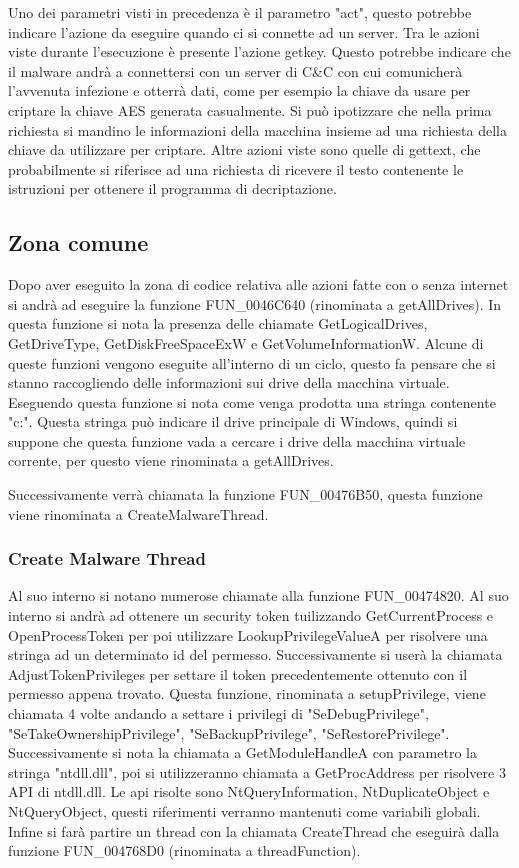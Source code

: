 \documentclass[a4paper,12pt]{article}
\begin{document}
Uno dei parametri visti in precedenza è il parametro "act", questo potrebbe indicare l'azione da eseguire quando ci si connette ad un server. Tra le azioni viste durante l'esecuzione è presente l'azione getkey. Questo potrebbe indicare che il malware andrà a connettersi con un server di C\&C con cui comunicherà l'avvenuta infezione e otterrà dati, come per esempio la chiave da usare per criptare la chiave AES generata casualmente. Si può ipotizzare che nella prima richiesta si mandino le informazioni della macchina insieme ad una richiesta della chiave da utilizzare per criptare.
Altre azioni viste sono quelle di gettext, che probabilmente si riferisce ad una richiesta di ricevere il testo contenente le istruzioni per ottenere il programma di decriptazione. 

\subsection{Zona comune}
Dopo aver eseguito la zona di codice relativa alle azioni fatte con o senza internet si andrà ad eseguire la funzione FUN\_0046C640 (rinominata a getAllDrives). In questa funzione si nota la presenza delle chiamate GetLogicalDrives, GetDriveType, GetDiskFreeSpaceExW e GetVolumeInformationW. Alcune di queste funzioni vengono eseguite all'interno di un ciclo, questo fa pensare che si stanno raccogliendo delle informazioni sui drive della macchina virtuale. Eseguendo questa funzione si nota come venga prodotta una stringa contenente "c:". Questa stringa può indicare il drive principale di Windows, quindi si suppone che questa funzione vada a cercare i drive della macchina virtuale corrente, per questo viene rinominata a getAllDrives.

Successivamente verrà chiamata la funzione FUN\_00476B50, questa funzione viene rinominata a CreateMalwareThread. 

\subsubsection{Create Malware Thread}
Al suo interno si notano numerose chiamate alla funzione FUN\_00474820. Al suo interno si andrà ad ottenere un security token tuilizzando GetCurrentProcess e OpenProcessToken per poi utilizzare LookupPrivilegeValueA per risolvere una stringa ad un determinato id del permesso. Successivamente si userà la chiamata AdjustTokenPrivileges per settare il token precedentemente ottenuto con il permesso appena trovato. Questa funzione, rinominata a setupPrivilege, viene chiamata 4 volte andando a settare i privilegi di "SeDebugPrivilege", "SeTakeOwnershipPrivilege", "SeBackupPrivilege", "SeRestorePrivilege". Successivamente si nota la chiamata a GetModuleHandleA con parametro la stringa "ntdll.dll", poi si utilizzeranno chiamata a GetProcAddress per risolvere 3 API di ntdll.dll. Le api risolte sono NtQueryInformation, NtDuplicateObject e NtQueryObject, questi riferimenti verranno mantenuti come variabili globali. Infine si farà partire un thread con la chiamata CreateThread che eseguirà dalla funzione FUN\_004768D0 (rinominata a threadFunction).
\end{document}
